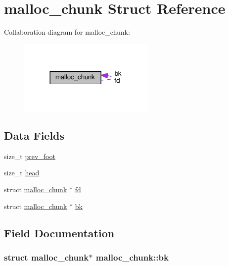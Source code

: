 \hypertarget{structmalloc__chunk}{}\section{malloc\+\_\+chunk Struct Reference}
\label{structmalloc__chunk}


Collaboration diagram for malloc\+\_\+chunk\+:\nopagebreak
\begin{figure}[H]
\begin{center}
\leavevmode
\includegraphics[width=189pt]{structmalloc__chunk__coll__graph}
\end{center}
\end{figure}
\subsection*{Data Fields}
\begin{DoxyCompactItemize}
\item 
size\+\_\+t \hyperlink{structmalloc__chunk_a2cbb92874183d7a4b42e150b7d7ec1f9}{prev\+\_\+foot}
\item 
size\+\_\+t \hyperlink{structmalloc__chunk_a7383bb525d34ca811283c927086205bc}{head}
\item 
struct \hyperlink{structmalloc__chunk}{malloc\+\_\+chunk} $\ast$ \hyperlink{structmalloc__chunk_a9972ab720231dd0c0d3c202176ce13c5}{fd}
\item 
struct \hyperlink{structmalloc__chunk}{malloc\+\_\+chunk} $\ast$ \hyperlink{structmalloc__chunk_a268940e08c9c09fc3b2e23cd804bce3c}{bk}
\end{DoxyCompactItemize}


\subsection{Field Documentation}
\subsubsection[{\texorpdfstring{bk}{bk}}]{\setlength{\rightskip}{0pt plus 5cm}struct {\bf malloc\+\_\+chunk}$\ast$ malloc\+\_\+chunk\+::bk}\hypertarget{structmalloc__chunk_a268940e08c9c09fc3b2e23cd804bce3c}{}\label{structmalloc__chunk_a268940e08c9c09fc3b2e23cd804bce3c}
